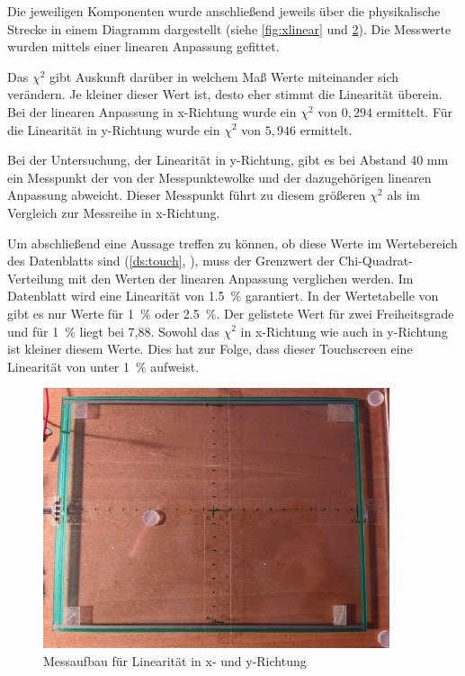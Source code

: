 Die jeweiligen Komponenten wurde anschließend jeweils über die physikalische Strecke in einem Diagramm dargestellt (siehe \cref{fig:xlinear} und \cref{fig:ylinear}).
Die Messwerte wurden mittels einer linearen Anpassung gefittet.

Das \(\chi^2\) gibt Auskunft darüber in welchem Maß Werte miteinander sich verändern.
Je kleiner dieser Wert ist, desto eher stimmt die Linearität überein.
Bei der linearen Anpassung in x-Richtung wurde ein \(\chi^2\) von \(0,294\) ermittelt.
Für die Linearität in y-Richtung wurde ein \(\chi^2\) von \(5,946\) ermittelt.

Bei der Untersuchung, der Linearität in y-Richtung, gibt es bei Abstand 40 mm ein Messpunkt der von der Messpunktewolke und der dazugehörigen linearen Anpassung abweicht. Dieser Messpunkt führt zu diesem größeren \(\chi^2\) als im Vergleich zur Messreihe  in x-Richtung.

Um abschließend eine Aussage treffen zu können, ob diese Werte im Wertebereich des Datenblatts sind (\cref{ds:touch}, ), muss der Grenzwert der Chi-Quadrat-Verteilung mit den Werten der linearen Anpassung verglichen werden.
Im Datenblatt wird eine Linearität von \SI{1,5}{\%} garantiert.
In der Wertetabelle von \cite{papula} gibt es nur Werte für \SI{1}{\%} oder \SI{2,5}{\%}.
Der gelistete Wert für zwei Freiheitsgrade und für \SI{1}{\%} liegt bei 7,88.
Sowohl das \(\chi^2\) in x-Richtung wie auch in y-Richtung ist kleiner diesem Werte.
Dies hat zur Folge, dass dieser Touchscreen eine Linearität von unter \SI{1}{\%} aufweist.
\begin{figure}[ht!]
    \centering
    \includegraphics[width=0.6\linewidth]{fig/raster/messlinear.jpg}
    \caption{Messaufbau für Linearität in x- und y-Richtung}
    \label{fig:messlinear}
\end{figure}

\begin{figure}[ht!]
    \centering
    
    \caption{}
    \label{fig:xlinear}
    
    \caption{}
    \label{fig:ylinear}
\end{figure}
